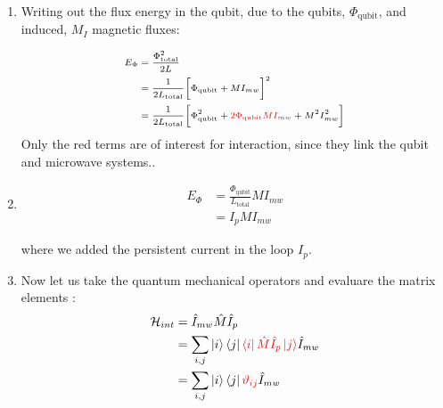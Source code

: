 \begin{minipage}{0.48\linewidth}
  \begin{enumerate}
  \item Writing  out the flux  energy in the qubit,  due to
    the qubits,  $ \Phi_\text{qubit} $,  and induced, $  M_I $
    magnetic fluxes:
	
    \begin{equation}\label{eq:couple8}{\scriptsize
      \begin{aligned}
        E_\Phi &= \frac{\Phi_\text{total}^2}{2L}\\
        & = \frac{1}{2L_{\text{total}}}\bigg[\Phi_\text{qubit} + MI_{mw}\bigg]^2\\
        &        =       \frac{1}{2L_\text{total}}\bigg[\Phi_\text{qubit}^2        +
        {\color{red}{2\Phi_\text{qubit}MI_{mw}}} + M^2I_{mw}^2\bigg]
      \end{aligned}}
  \end{equation}
  \noindent  Only  the  red   terms  are  of  interest  for
  interaction,  since they  link  the  qubit and  microwave
  systems..
	
\item \begin{equation}\label{eq:couple9}
    \begin{aligned}
      E_\Phi &= \frac{\Phi_\text{qubit}}{L_\text{total}}MI_{mw}\\
      & = I_pMI_{mw}
    \end{aligned}
  \end{equation}
	
  \noindent where  we added  the persistent current  in the
  loop $ I_p $.

\item Now let us take  the quantum mechanical operators and
  evaluare the matrix elements \cite{Astafiev2010}:
  \begin{equation}\label{eqn:dipole_1}
    \begin{aligned}
      \mathcal{H}_{int} & = \hat{I}_{mw}\hat{M}\hat{I}_p\\
      & = \sum_{i,j}\ket{i}\bra{j}{\color{red}{\bra{i}\hat{M}\hat{I}_p\ket{j}}} \hat{I}_{mw}\\
      & = \sum_{i,j}\ket{i}\bra{j}{\color{red}{\vartheta_{ij}}} \hat{I}_{mw}\\
    \end{aligned}
  \end{equation}
  

\end{enumerate}
\end{minipage}
